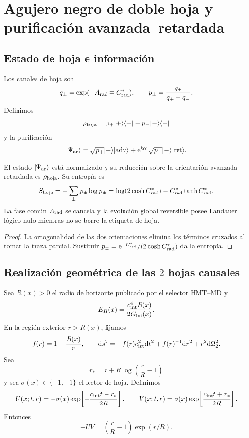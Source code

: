 \section{Agujero negro de doble hoja y purificación avanzada--retardada}
\label{sec:hmtf2-agujero-negro}

\subsection{Estado de hoja e información}

Los canales de hoja son
\[
 q_\pm=\exp(-A_{\rm rad}\mp C_{\rm rad}^*),\qquad
 p_\pm=\frac{q_\pm}{q_++q_-}.
\]
Definimos
\[
 \rho_{\rm hoja}
 =p_+|+\rangle\langle+|+p_-|-\rangle\langle-|
\]
y la purificación
\[
 |\Psi_{\rm ar}\rangle
 =\sqrt{p_+}|+\rangle|{\rm adv}\rangle
 +\mathrm e^{{\rm i}\chi_0}
  \sqrt{p_-}|-\rangle|{\rm ret}\rangle.
\]

\begin{proposition}
\label{prop:hmtf2-purificacion-hojas}
El estado \(|\Psi_{\rm ar}\rangle\) está normalizado y su reducción sobre la
orientación avanzada--retardada es \(\rho_{\rm hoja}\). Su entropía es
\[
 S_{\rm hoja}
 =-\sum_\pm p_\pm\log p_\pm
 =\log(2\cosh C_{\rm rad}^*)
  -C_{\rm rad}^*\tanh C_{\rm rad}^*.
\]
La fase común \(A_{\rm rad}\) se cancela y la evolución global reversible
posee Landauer lógico nulo mientras no se borre la etiqueta de hoja.
\end{proposition}

\begin{proof}
La ortogonalidad de las dos orientaciones elimina los términos cruzados al
tomar la traza parcial. Sustituir
\(p_\pm=\mathrm e^{\mp C_{\rm rad}^*}/(2\cosh C_{\rm rad}^*)\) da la
entropía.
\end{proof}

\subsection{Realización geométrica de las \(2\) hojas causales}

Sea \(R(x)>0\) el radio de horizonte publicado por el selector HMT--MD y
\[
 E_H(x)=\frac{c_{\rm int}^4R(x)}{2G_{\rm int}(x)}.
\]
En la región exterior \(r>R(x)\), fijamos
\[
 f(r)=1-\frac{R(x)}r,\qquad
 \mathrm ds^2=-f(r)c_{\rm int}^2\mathrm dt^2
 +f(r)^{-1}\mathrm dr^2+r^2\mathrm d\Omega_2^2.
\]
Sea
\[
 r_*=r+R\log\!\left(\frac rR-1\right)
\]
y sea \(\sigma(x)\in\{+1,-1\}\) el lector de hoja. Definimos
\[
 U(x;t,r)
 =-\sigma(x)\exp\!\left[-\frac{c_{\rm int}t-r_*}{2R}\right],
 \qquad
 V(x;t,r)
 = \sigma(x)\exp\!\left[\frac{c_{\rm int}t+r_*}{2R}\right].
\]
Entonces
\[
 -UV=\left(\frac rR-1\right)\exp(r/R).
\]

